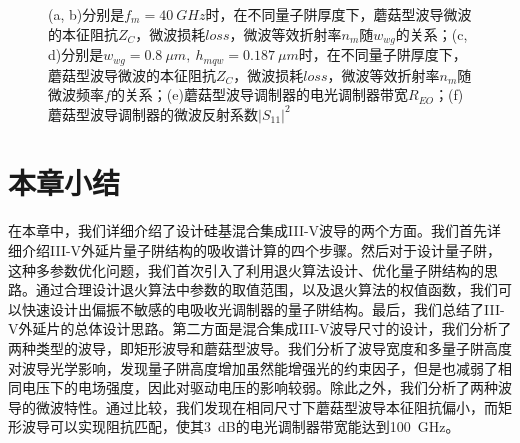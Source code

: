 \begin{figure}[!h]
{\begin{minipage}[]{0.5\textwidth}
							\end{minipage}}
							\caption{(a, b)分别是$f_m = 40~GHz$时，在不同量子阱厚度下，蘑菇型波导微波的本征阻抗$Z_C$，微波损耗$loss$，微波等效折射率$n_m$随$w_{wg}$的关系；(c, d)分别是$w_{wg} = 0.8 ~\mu m,~ h_{mqw} = 0.187 ~\mu m$时，在不同量子阱厚度下，蘑菇型波导微波的本征阻抗$Z_C$，微波损耗$loss$，微波等效折射率$n_m$随微波频率$f$的关系；(e)蘑菇型波导调制器的电光调制器带宽$R_{EO}$；(f)蘑菇型波导调制器的微波反射系数$|S_{11}|^2$}
							\label{fig_ch2_ms_3dB_S11}
						\end{figure}
			
\section{本章小结}
在本章中，我们详细介绍了设计硅基混合集成III-V波导的两个方面。我们首先详细介绍III-V外延片量子阱结构的吸收谱计算的四个步骤。然后对于设计量子阱，这种多参数优化问题，我们首次引入了利用退火算法设计、优化量子阱结构的思路。通过合理设计退火算法中参数的取值范围，以及退火算法的权值函数，我们可以快速设计出偏振不敏感的电吸收光调制器的量子阱结构。最后，我们总结了III-V外延片的总体设计思路。第二方面是混合集成III-V波导尺寸的设计，我们分析了两种类型的波导，即矩形波导和蘑菇型波导。我们分析了波导宽度和多量子阱高度对波导光学影响，发现量子阱高度增加虽然能增强光的约束因子，但是也减弱了相同电压下的电场强度，因此对驱动电压的影响较弱。除此之外，我们分析了两种波导的微波特性。通过比较，我们发现在相同尺寸下蘑菇型波导本征阻抗偏小，而矩形波导可以实现阻抗匹配，使其3~dB的电光调制器带宽能达到100~GHz。